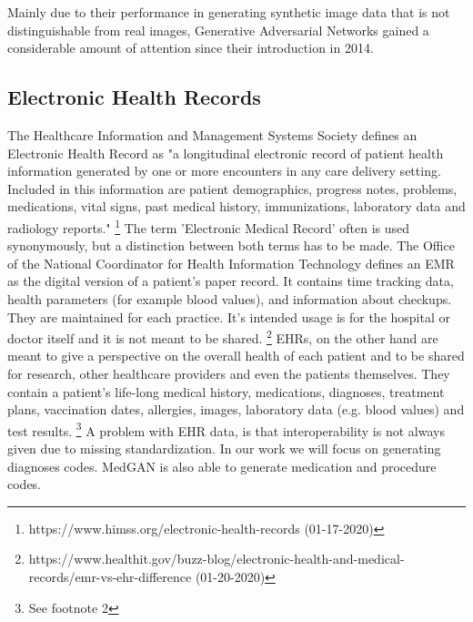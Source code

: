 \documentclass[11pt, a4paper, oneside]{book}
\begin{document}
Mainly due to their performance in generating synthetic image data that is not distinguishable from real images, Generative Adversarial Networks gained a considerable amount of attention since their introduction in 2014.


\subsection{Electronic Health Records}
The Healthcare Information and Management Systems Society defines an Electronic Health Record as "a longitudinal electronic record of patient health information generated by one or more encounters in any care delivery setting. Included in this information are patient demographics, progress notes, problems, medications, vital signs, past medical history, immunizations, laboratory data and radiology reports." \footnote{https://www.himss.org/electronic-health-records (01-17-2020)}
The term 'Electronic Medical Record' often is used synonymously, but a distinction between both terms has to be made.
The Office of the National Coordinator for Health Information Technology defines an EMR as the digital version of a patient's paper record. It contains time tracking data, health parameters (for example blood values), and information about checkups. They are maintained for each practice. It's intended usage is for the hospital or doctor itself and it is not meant to be shared. \footnote{https://www.healthit.gov/buzz-blog/electronic-health-and-medical-records/emr-vs-ehr-difference (01-20-2020)}
EHRs, on the other hand are meant to give a perspective on the overall health of each patient and to be shared for research, other healthcare providers and even the patients themselves. They contain a patient's life-long medical history, medications, diagnoses, treatment plans, vaccination dates, allergies, images, laboratory data (e.g. blood values) and test results. \footnote{See footnote 2} A problem with EHR data, is that interoperability is not always given due to missing standardization. \citep{johnson2016mimic}
In our work we will focus on generating diagnoses codes. MedGAN is also able to generate medication and procedure codes.
\end{document}
